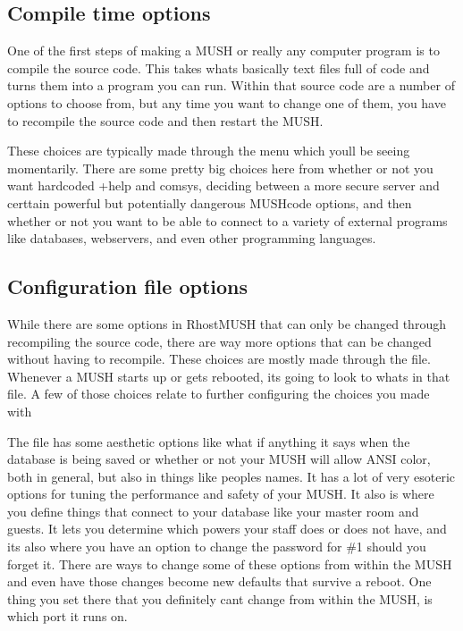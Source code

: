 \documentclass[letterpaper,10pt,english]{sphinxmanual}
\begin{document}
\subsection{Compile time options}
\label{\detokenize{install:compile-time-options}}
\sphinxAtStartPar
One of the first steps of making a MUSH or really any computer program is
to compile the source code. This takes what\textquotesingle{}s basically text files full of code
and turns them into a program you can run. Within that source code are a
number of options to choose from, but any time you want to change one of them,
you have to recompile the source code and then restart the MUSH.

\sphinxAtStartPar
These choices are typically made through the  menu which you\textquotesingle{}ll
be seeing momentarily. There are some pretty big choices here from whether or
not you want hardcoded +help and comsys, deciding between a more secure server
and certtain powerful but potentially dangerous MUSHcode options, and then
whether or not you want to be able to connect to a variety of external programs
like databases, webservers, and even other programming languages.


\subsection{Configuration file options}
\label{\detokenize{install:configuration-file-options}}
\sphinxAtStartPar
While there are some options in RhostMUSH that can only be changed through
recompiling the source code, there are way more options that can be changed
without having to recompile. These choices are mostly made through the
 file. Whenever a MUSH starts up or gets rebooted, it\textquotesingle{}s
going to look to what\textquotesingle{}s in that file. A few of those choices relate to
further configuring the choices you made with 

\sphinxAtStartPar
The  file has some aesthetic options like what if anything
it says when the database is being saved or whether or not your MUSH will
allow ANSI color, both in general, but also in things like people\textquotesingle{}s names.
It has a lot of very esoteric options for tuning the performance and safety
of your MUSH. It also is where you define things that connect to your database
like your master room and guests. It let\textquotesingle{}s you determine which powers your
staff does or does not have, and it\textquotesingle{}s also where you have an option to change
the password for \#1 should you forget it. There are ways to change some of
these options from within the MUSH and even have those changes become new
defaults that survive a reboot. One thing you set there that you definitely
can\textquotesingle{}t change from within the MUSH, is which port it runs on.
\end{document}
